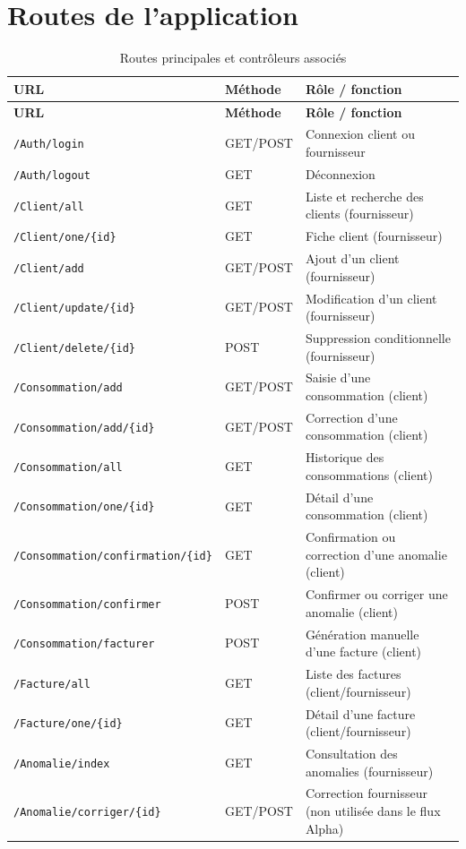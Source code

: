 \appendix

\clearpage
\section{Routes de l'application}

\begin{longtable}{p{}p{}p{}}
\caption{Routes principales et contrôleurs associés}\label{tab:routes}\\
\toprule
\textbf{URL} & \textbf{Méthode} & \textbf{Rôle / fonction} \\
\midrule
\endfirsthead
\toprule
\textbf{URL} & \textbf{Méthode} & \textbf{Rôle / fonction} \\
\midrule
\endhead
\texttt{/Auth/login} & GET/POST & Connexion client ou fournisseur \\
\texttt{/Auth/logout} & GET & Déconnexion \\
\texttt{/Client/all} & GET & Liste et recherche des clients (fournisseur) \\
\texttt{/Client/one/\{id\}} & GET & Fiche client (fournisseur) \\
\texttt{/Client/add} & GET/POST & Ajout d'un client (fournisseur) \\
\texttt{/Client/update/\{id\}} & GET/POST & Modification d'un client (fournisseur) \\
\texttt{/Client/delete/\{id\}} & POST & Suppression conditionnelle (fournisseur) \\
\texttt{/Consommation/add} & GET/POST & Saisie d'une consommation (client) \\
\texttt{/Consommation/add/\{id\}} & GET/POST & Correction d'une consommation (client) \\
\texttt{/Consommation/all} & GET & Historique des consommations (client) \\
\texttt{/Consommation/one/\{id\}} & GET & Détail d'une consommation (client) \\
\texttt{/Consommation/confirmation/\{id\}} & GET & Confirmation ou correction d'une anomalie (client) \\
\texttt{/Consommation/confirmer} & POST & Confirmer ou corriger une anomalie (client) \\
\texttt{/Consommation/facturer} & POST & Génération manuelle d'une facture (client) \\
\texttt{/Facture/all} & GET & Liste des factures (client/fournisseur) \\
\texttt{/Facture/one/\{id\}} & GET & Détail d'une facture (client/fournisseur) \\
\texttt{/Anomalie/index} & GET & Consultation des anomalies (fournisseur) \\
\texttt{/Anomalie/corriger/\{id\}} & GET/POST & Correction fournisseur (non utilisée dans le flux Alpha) \\
\bottomrule
\end{longtable}

